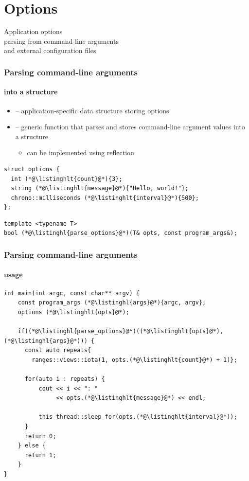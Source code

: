 \documentclass[compress,table,xcolor=table]{beamer}
\begin{document}
\section{Options}
\begin{frame}[c]
  \Huge
  \centering
  Application options\\
  \large
  parsing from command-line arguments\\
  and external configuration files
\end{frame}
\begin{frame}[fragile]
  \frametitle{Parsing command-line arguments}
  \framesubtitle{into a structure}
  \small
  \begin{itemize}
    \item {} -- application-specific data structure
      storing options
    \item {} -- generic function that parses and stores
      command-line argument values into a structure
    \begin{itemize}
      \item can be implemented using reflection
    \end{itemize}
  \end{itemize}
  \begin{lstlisting}[language=c++2x,basicstyle=\small\ttfamily]
struct options {
  int (*@\listinghlt{count}@*){3};
  string (*@\listinghlt{message}@*){"Hello, world!"};
  chrono::milliseconds (*@\listinghlt{interval}@*){500};
};
  \end{lstlisting}
  \vfill
  \begin{lstlisting}[language=c++2x,basicstyle=\footnotesize\ttfamily]
template <typename T>
bool (*@\listinghl{parse_options}@*)(T& opts, const program_args&);
  \end{lstlisting}
\end{frame}
\begin{frame}[fragile]
  \frametitle{Parsing command-line arguments}
  \framesubtitle{usage}
  \begin{lstlisting}[language=c++2x,basicstyle=\footnotesize\ttfamily]
int main(int argc, const char** argv) {
    const program_args (*@\listinghl{args}@*){argc, argv};
    options (*@\listinghlt{opts}@*);

    if((*@\listinghl{parse_options}@*)((*@\listinghlt{opts}@*), (*@\listinghl{args}@*))) {
      const auto repeats{
        ranges::views::iota(1, opts.(*@\listinghlt{count}@*) + 1)};

      for(auto i : repeats) {
          cout << i << ": "
               << opts.(*@\listinghlt{message}@*) << endl;

          this_thread::sleep_for(opts.(*@\listinghlt{interval}@*));
      }
      return 0;
    } else {
      return 1;
    }
}  \end{lstlisting}
\end{frame}
\end{document}
